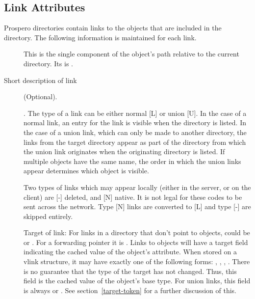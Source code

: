 \subsection{Link Attributes\label{target-attribute}}

Prospero directories contain links to the objects that are included in
the directory. The following information is maintained for each link.

\begin{description}

\item[] This is the single component of the
object's path relative to the current directory.  Its
 is .

\item[Short description of link] (Optional).

\item[].  The type of a link can be either 
normal [L] or union [U].  In the case of a normal link, an entry for
the link is visible when the directory is listed.  In the case of a
union link, which can only be made to another directory, the links
from the target directory appear as part of the directory from which
the union link originates when the originating directory is listed.
If multiple objects have the same name, the order in which the union
links appear determines which object is visible.

Two types of links which may appear locally (either in the server, or
on the client) are [-] deleted, and [N] native.  It is not legal for
these codes to be sent across the network.  Type [N] links are
converted to [L] and type [-] are skipped entirely.

\item[]  Target of link:  For links in a directory that
don't point to objects, could be  or . For a
forwarding pointer it is .  Links to objects will have a target
field indicating the cached value of the object's 
attribute.  When stored on a vlink structure, it may have exactly one
of the following forms: , , ,
.  There is no guarantee that the type of the target
has not changed.  Thus, this field is the cached value of the object's
base type.  For union links, this field is always  or
.  See section~\ref{target-token} for a further
discussion of this.



\end{description}
